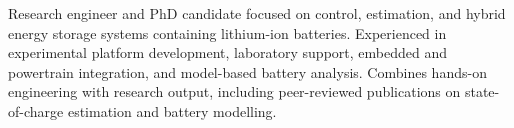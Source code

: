 

\begin{cvparagraph}

Research engineer and PhD candidate focused on control, estimation, and hybrid energy storage systems containing lithium-ion batteries. Experienced in experimental platform development, laboratory support, embedded and powertrain integration, and model-based battery analysis. Combines hands-on engineering with research output, including peer-reviewed publications on state-of-charge estimation and battery modelling.

\end{cvparagraph}
